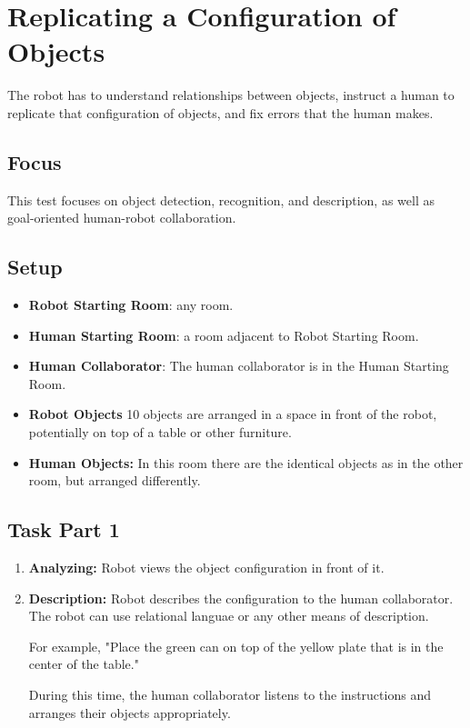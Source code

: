 \section{Replicating a Configuration of Objects}

The robot has to understand relationships between objects, instruct a human to replicate that configuration of objects, and fix errors that the human makes.

\subsection{Focus}

This test focuses on object detection, recognition, and description, as well as goal-oriented human-robot collaboration.

\subsection{Setup}
\begin{itemize}
	\item \textbf{Robot Starting Room}: any room.
	\item \textbf{Human Starting Room}: a room adjacent to Robot Starting Room.
	\item \textbf{Human Collaborator}: The human collaborator is in the Human Starting Room.
	\item \textbf{Robot Objects} 10 objects are arranged in a space in front of the robot, potentially on top of a table or other furniture.
	\item \textbf{Human Objects:} In this room there are the identical objects as in the other room, but arranged differently.
\end{itemize}

\subsection{Task Part 1}

\begin{enumerate}

	\item \textbf{Analyzing:} Robot views the object configuration in front of it.

	\item \textbf{Description:} Robot describes the configuration to the human collaborator.  The robot can use relational languae or any other means of description.

	For example, "Place the green can on top of the yellow plate that is in the center of the table."

	During this time, the human collaborator listens to the instructions and arranges their objects appropriately.

\end{enumerate}

